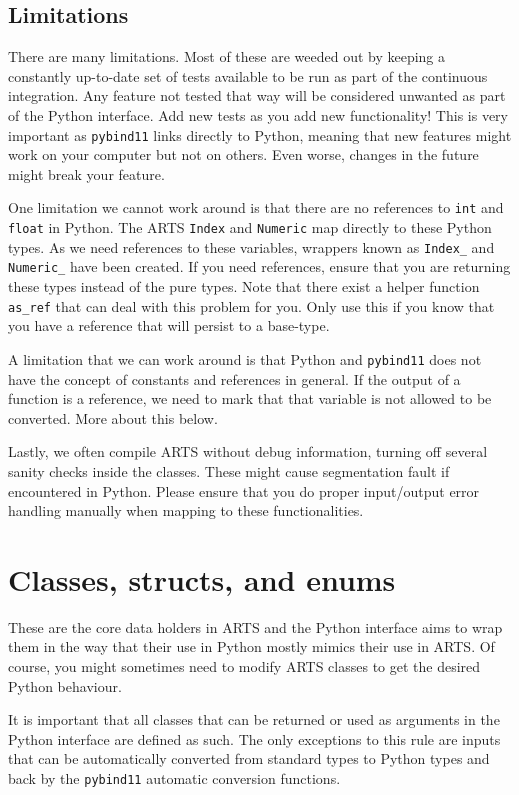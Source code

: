 \subsection{Limitations}
There are many limitations.  Most of these are weeded out by keeping a constantly up-to-date set of tests available to be run as part of the continuous
integration.  Any feature not tested that way will be considered unwanted as part of the Python interface.  Add new tests as you add new functionality!
This is very important as \texttt{pybind11} links directly to Python, meaning that new features might work on your computer but not on others.  Even worse,
changes in the future might break your feature.

One limitation we cannot work around is that there are no references to \texttt{int} and \texttt{float} in Python.  The 
ARTS \texttt{Index} and \texttt{Numeric} map directly to these Python types.  As we need references to these variables,
wrappers known as \texttt{Index_} and \texttt{Numeric_} have been created.  If you need references, ensure that you are returning
these types instead of the pure types.  Note that there exist a helper function \texttt{as_ref} that can deal with this problem
for you.  Only use this if you know that you have a reference that will persist to a base-type.

A limitation that we can work around is that Python and \texttt{pybind11} does not have the concept of constants and
references in general.  If the output of a function is a reference, we need to mark that that variable is not allowed to
be converted.  More about this below.

Lastly, we often compile ARTS without debug information, turning off several sanity checks inside the classes.
These might cause segmentation fault if encountered in Python.  Please ensure that you do proper input/output
error handling manually when mapping to these functionalities.

\section{Classes, structs, and enums}
These are the core data holders in ARTS and the Python interface aims to wrap them in the way that their use in
Python mostly mimics their use in ARTS.  Of course, you might sometimes need to modify ARTS classes to get the
desired Python behaviour.

It is important that all classes that can be returned or used as arguments in the Python interface are defined as such.
The only exceptions to this rule are inputs that can be automatically converted from standard types to Python types
and back by the \texttt{pybind11} automatic conversion functions.

